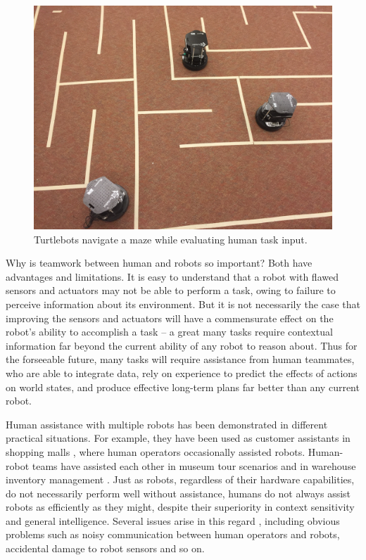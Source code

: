 \documentclass{sig-alternate}
\begin{document}
\begin{figure}
\centering
\includegraphics[width=.5\textwidth]{robots-in-maze.jpg}
\caption{Turtlebots navigate a maze while evaluating human task input.}
\label{fig:game_photo}
\end{figure}

Why is teamwork between human and robots so important?  Both have
advantages and limitations. It is easy to understand that a robot with
flawed sensors and actuators may not be able to perform a task, owing
to failure to perceive information about its environment.  But it is
not necessarily the case that improving the sensors and actuators will
have a commensurate effect on the robot's ability to accomplish a task
-- a great many tasks require contextual information far beyond the
current ability of any robot to reason about.  Thus for the forseeable
future, many tasks will require assistance from human teammates, who
are able to integrate data, rely on experience to predict the effects
of actions on world states, and produce effective long-term plans far
better than any current robot.

Human assistance with multiple robots has been demonstrated in
different practical situations. For example, they have been used as
customer assistants in shopping malls \cite{zheng2013supervisory,
  Kanda:2009:AGR:1514095.1514127}, where human operators occasionally
assisted robots. Human-robot teams have assisted each other in museum
tour scenarios \cite{thrun1999minerva} and in warehouse inventory
management \cite{wurman2008coordinating}.  Just as robots, regardless
of their hardware capabilities, do not necessarily perform well
without assistance, humans do not always assist robots as efficiently
as they might, despite their superiority in context sensitivity and
general intelligence.  Several issues arise in this regard
\cite{breazeal2004social}, including obvious problems such as noisy
communication between human operators and robots, accidental damage to
robot sensors and so on.
\end{document}
